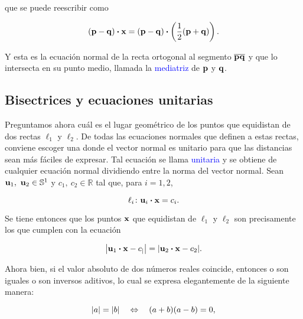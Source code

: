 \documentclass{article}
\theoremstyle{definicion}
\theoremstyle{definition}             %
\theoremstyle{definition}             %
\theoremstyle{definition}
\theoremstyle{definition}
\theoremstyle{observacion}
\theoremstyle{definition}
\theoremstyle{plain}
\theoremstyle{definition}
\theoremstyle{afirmacion}
\theoremstyle{notation}
\theoremstyle{definition}
\begin{document}
        que se puede reescribir como

        \begin{equation*}
            (\vb{p} - \vb{q}) \vdot \vb{x} = (\vb{p} - \vb{q}) \vdot \left(\dfrac{1}{2}(\vb{p} + \vb{q})\right).
        \end{equation*}

        Y esta es la ecuación normal de la recta ortogonal al segmento \(\overline{\vb{p}\vb{q}}\) y que lo intersecta en su punto medio, llamada la \textcolor{blue}{mediatriz} de \(\vb{p}\) y \(\vb{q}\).

        \subsection{Bisectrices y ecuaciones unitarias}

        Preguntamos ahora cuál es el lugar geométrico de los puntos que equidistan de dos rectas \(\ell_{1}\) y \(\ell_{2}\). De todas las ecuaciones normales que definen a estas rectas, conviene escoger una donde el vector normal es unitario para que las distancias sean más fáciles de expresar. Tal ecuación se llama \textcolor{blue}{unitaria} y se obtiene de cualquier ecuación normal dividiendo entre la norma del vector normal. Sean \(\vb{u}_{1},\ \vb{u}_{2} \in \mathbb{S}^{1}\) y \(c_{1},\ c_{2} \in \mathbb{R}\) tal que, para \(i = 1, 2\),
        
        \begin{equation*}
            \ell_{i} \colon \vb{u}_{i} \vdot \vb{x} = c_{i}.
        \end{equation*}

        Se tiene entonces que los puntos \(\vb{x}\) que equidistan de \(\ell_{1}\) y \(\ell_{2}\) son precisamente los que cumplen con la ecuación

        \begin{equation*}
            \abs{\vb{u}_{1} \vdot \vb{x} - c_{|}} = \abs{\vb{u}_{2} \vdot \vb{x} - c_{2}}.
        \end{equation*}

        Ahora bien, si el valor absoluto de dos números reales coincide, entonces o son iguales o son inversos aditivos, lo cual se expresa elegantemente de la siguiente manera:

        \begin{equation*}
            \abs{a} = \abs{b}\quad \Leftrightarrow\quad (a + b)(a - b) = 0,
        \end{equation*}
\end{document}
